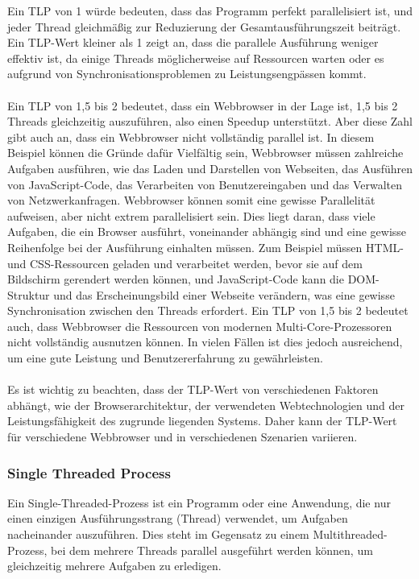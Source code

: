 Ein TLP von 1 würde bedeuten, dass das Programm perfekt parallelisiert ist, und jeder Thread gleichmäßig zur Reduzierung der Gesamtausführungszeit beiträgt. Ein TLP-Wert kleiner als 1 zeigt an, dass die parallele Ausführung weniger effektiv ist, da einige Threads möglicherweise auf Ressourcen warten oder es aufgrund von Synchronisationsproblemen zu Leistungsengpässen kommt.\\\\

Ein TLP von 1,5 bis 2 bedeutet, dass ein Webbrowser in der Lage ist, 1,5 bis 2 Threads gleichzeitig auszuführen, also einen Speedup unterstützt. Aber diese Zahl gibt auch an, dass ein Webbrowser nicht vollständig parallel ist. In diesem Beispiel können die Gründe dafür Vielfältig sein, Webbrowser müssen zahlreiche Aufgaben ausführen, wie das Laden und Darstellen von Webseiten, das Ausführen von JavaScript-Code, das Verarbeiten von Benutzereingaben und das Verwalten von Netzwerkanfragen. 
Webbrowser können somit eine gewisse Parallelität aufweisen, aber nicht extrem parallelisiert sein. Dies liegt daran, dass viele Aufgaben, die ein Browser ausführt, voneinander abhängig sind und eine gewisse Reihenfolge bei der Ausführung einhalten müssen. Zum Beispiel müssen HTML- und CSS-Ressourcen geladen und verarbeitet werden, bevor sie auf dem Bildschirm gerendert werden können, und JavaScript-Code kann die DOM-Struktur und das Erscheinungsbild einer Webseite verändern, was eine gewisse Synchronisation zwischen den Threads erfordert.
Ein TLP von 1,5 bis 2 bedeutet auch, dass Webbrowser die Ressourcen von modernen Multi-Core-Prozessoren nicht vollständig ausnutzen können. In vielen Fällen ist dies jedoch ausreichend, um eine gute Leistung und Benutzererfahrung zu gewährleisten.\\\\

Es ist wichtig zu beachten, dass der TLP-Wert von verschiedenen Faktoren abhängt, wie der Browserarchitektur, der verwendeten Webtechnologien und der Leistungsfähigkeit des zugrunde liegenden Systems. Daher kann der TLP-Wert für verschiedene Webbrowser und in verschiedenen Szenarien variieren.

\subsubsection{Single Threaded Process}
Ein Single-Threaded-Prozess ist ein Programm oder eine Anwendung, die nur einen einzigen Ausführungsstrang (Thread) verwendet, um Aufgaben nacheinander auszuführen. Dies steht im Gegensatz zu einem Multithreaded-Prozess, bei dem mehrere Threads parallel ausgeführt werden können, um gleichzeitig mehrere Aufgaben zu erledigen.

